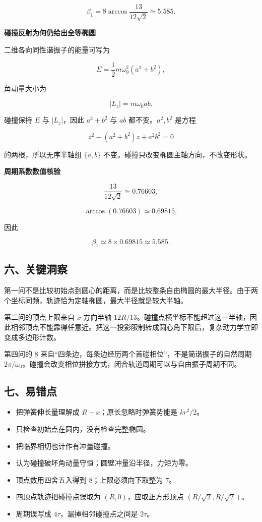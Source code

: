\documentclass[12pt,a4paper,UTF8]{ctexart}
\newcommand{\tightlist}{\setlength{\itemsep}{0pt}\setlength{\parskip}{0pt}}
\begin{document}
\[
\boxed{
\beta_1=8\arccos\frac{13}{12\sqrt2}
\simeq5.585
}.
\]

\textbf{碰撞反射为何仍给出全等椭圆}

二维各向同性谐振子的能量可写为

\[E=\frac12m\omega_0^2(a^2+b^2),\]

角动量大小为

\[|L_z|=m\omega_0ab.\]

碰撞保持 \(E\) 与 \(|L_z|\)，因此 \(a^2+b^2\) 与 \(ab\)
都不变。\(a^2,b^2\) 是方程

\[z^2-(a^2+b^2)z+a^2b^2=0\]

的两根，所以无序半轴组 \(\{a,b\}\)
不变。碰撞只改变椭圆主轴方向，不改变形状。

\textbf{周期系数数值核验}

\[
\frac{13}{12\sqrt2}\simeq0.76603,
\]

\[
\arccos(0.76603)\simeq0.69815,
\]

因此

\[\beta_1\simeq8\times0.69815\simeq5.585.\]

\subsection{六、关键洞察}\label{ux516dux5173ux952eux6d1eux5bdf-4}

第一问不是比较初始点到圆心的距离，而是比较整条自由椭圆的最大半径。由于两个坐标同频，轨迹恰为定轴椭圆，最大半径就是较大半轴。

第二问的顶点上限来自 \(x\) 方向半轴
\(12R/13\)。碰撞点横坐标不能超过这一半轴，因此相邻顶点不能靠得任意近。把这一投影限制转成圆心角下限后，复杂动力学立即变成多边形计数。

第四问的 \(8\)
来自``四条边，每条边经历两个首碰相位''，不是简谐振子的自然周期
\(2\pi/\omega_0\)。碰撞会改变相位拼接方式，闭合轨道周期可以与自由振子周期不同。

\subsection{七、易错点}\label{ux4e03ux6613ux9519ux70b9-4}

\begin{itemize}
\tightlist
\item
  把弹簧伸长量理解成 \(R-x\)；原长忽略时弹簧势能是 \(kr^2/2\)。
\item
  只检查初始点在圆内，没有检查完整椭圆。
\item
  把临界相切也计作有冲量碰撞。
\item
  认为碰撞破坏角动量守恒；圆壁冲量沿半径，力矩为零。
\item
  顶点数用四舍五入得到 \(8\)；上限必须向下取整为 \(7\)。
\item
  四顶点轨迹把碰撞点误取为 \((R,0)\)，应取正方形顶点
  \((R/\sqrt2,R/\sqrt2)\)。
\item
  周期误写成 \(4\tau\)，漏掉相邻碰撞点之间是 \(2\tau\)。
\end{itemize}
\end{document}
